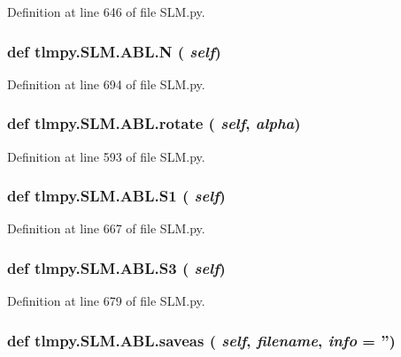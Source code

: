 Definition at line 646 of file SLM.py.\hypertarget{classtlmpy_1_1SLM_1_1ABL_a604538487a75c47dbd93c7518e58f3f1}{
\subsubsection[{N}]{\setlength{\rightskip}{0pt plus 5cm}def tlmpy.SLM.ABL.N ( {\em self})}}
\label{classtlmpy_1_1SLM_1_1ABL_a604538487a75c47dbd93c7518e58f3f1}


Definition at line 694 of file SLM.py.\hypertarget{classtlmpy_1_1SLM_1_1ABL_a57ccba54f0284a1a6e1335bb7b341e80}{
\subsubsection[{rotate}]{\setlength{\rightskip}{0pt plus 5cm}def tlmpy.SLM.ABL.rotate ( {\em self}, \/   {\em alpha})}}
\label{classtlmpy_1_1SLM_1_1ABL_a57ccba54f0284a1a6e1335bb7b341e80}


Definition at line 593 of file SLM.py.\hypertarget{classtlmpy_1_1SLM_1_1ABL_a49b686e3e305d0fde48174a907a203e0}{
\subsubsection[{S1}]{\setlength{\rightskip}{0pt plus 5cm}def tlmpy.SLM.ABL.S1 ( {\em self})}}
\label{classtlmpy_1_1SLM_1_1ABL_a49b686e3e305d0fde48174a907a203e0}


Definition at line 667 of file SLM.py.\hypertarget{classtlmpy_1_1SLM_1_1ABL_a5383c931bc8772cd04871b0f88aecbe7}{
\subsubsection[{S3}]{\setlength{\rightskip}{0pt plus 5cm}def tlmpy.SLM.ABL.S3 ( {\em self})}}
\label{classtlmpy_1_1SLM_1_1ABL_a5383c931bc8772cd04871b0f88aecbe7}


Definition at line 679 of file SLM.py.\hypertarget{classtlmpy_1_1SLM_1_1ABL_a242724d516ea41ddec6c86fe11ab985d}{
\subsubsection[{saveas}]{\setlength{\rightskip}{0pt plus 5cm}def tlmpy.SLM.ABL.saveas ( {\em self}, \/   {\em filename}, \/   {\em info} = {\ttfamily ''})}}
\label{classtlmpy_1_1SLM_1_1ABL_a242724d516ea41ddec6c86fe11ab985d}


